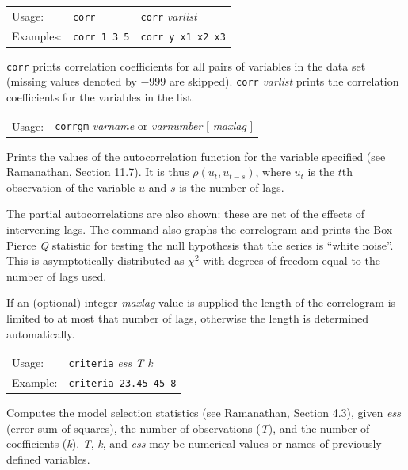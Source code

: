 \documentclass{article}
\begin{document}
{

\begin{tabular}{lll}
Usage:  & \texttt{corr} & \texttt{corr} \textit{varlist} \\
Examples: & \texttt{corr 1 3 5} & \texttt{corr y x1 x2 x3}
\end{tabular}

\texttt{corr} prints correlation coefficients for all pairs of
variables in the data set (missing values denoted by $-999$ are
skipped).  \texttt{corr} \textit{varlist} prints the correlation
coefficients for the variables in the list.



\begin{tabular}{ll}
Usage:  &  \texttt{corrgm} \textit{varname} or \textit{varnumber}
           [ \textit{maxlag} ]
\end{tabular}

Prints the values of the autocorrelation function for the variable
specified (see Ramanathan, Section 11.7).  It is thus $\rho(u_t,
u_{t-s})$, where $u_t$ is the $t$th observation of the variable $u$
and $s$ is the number of lags.

The partial autocorrelations are also shown: these are net of the
effects of intervening lags.  The command also graphs the correlogram
and prints the Box-Pierce \textit{Q} statistic for testing the null
hypothesis that the series is ``white noise''.  This is asymptotically
distributed as $\chi^2$ with degrees of freedom equal to the number of
lags used.

If an (optional) integer \textit{maxlag} value is supplied the length
of the correlogram is limited to at most that number of lags,
otherwise the length is determined automatically.


\begin{tabular}{ll}
Usage: & \texttt{criteria} \textit{ess T k}  \\
Example: & \texttt{criteria 23.45 45 8}
\end{tabular}

Computes the model selection statistics (see Ramanathan, Section 4.3),
given \textit{ess} (error sum of squares), the number of observations
(\textit{T}), and the number of coefficients (\textit{k}).
\textit{T}, \textit{k}, and \textit{ess} may be numerical values or
names of previously defined variables.


}
\end{document}
